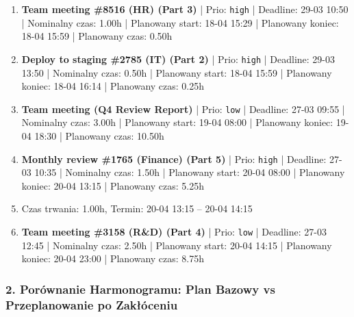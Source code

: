 {\begin{enumerate}
  \item [\textbf{14624}] \textbf{Team meeting \#8516 (HR) (Part 3)} | Prio: \texttt{high} | Deadline: 29-03 10:50 | Nominalny czas: 1.00h | Planowany start: 18-04 15:29 | Planowany koniec: 18-04 15:59 | Planowany czas: 0.50h
  \item [\textbf{14623}] \textbf{Deploy to staging \#2785 (IT) (Part 2)} | Prio: \texttt{high} | Deadline: 29-03 13:50 | Nominalny czas: 0.50h | Planowany start: 18-04 15:59 | Planowany koniec: 18-04 16:14 | Planowany czas: 0.25h
  \item [\textbf{14682}] \textbf{Team meeting (Q4 Review Report)} | Prio: \texttt{low} | Deadline: 27-03 09:55 | Nominalny czas: 3.00h | Planowany start: 19-04 08:00 | Planowany koniec: 19-04 18:30 | Planowany czas: 10.50h
  \item [\textbf{14627}] \textbf{Monthly review \#1765 (Finance) (Part 5)} | Prio: \texttt{high} | Deadline: 27-03 10:35 | Nominalny czas: 1.50h | Planowany start: 20-04 08:00 | Planowany koniec: 20-04 13:15 | Planowany czas: 5.25h
  \item [\textbf{PRZERWA}] Czas trwania: 1.00h, Termin: 20-04 13:15 -- 20-04 14:15
  \item [\textbf{14688}] \textbf{Team meeting \#3158 (R\&D) (Part 4)} | Prio: \texttt{low} | Deadline: 27-03 12:45 | Nominalny czas: 2.50h | Planowany start: 20-04 14:15 | Planowany koniec: 20-04 23:00 | Planowany czas: 8.75h
\end{enumerate}
}

\subsubsection*{2. Porównanie Harmonogramu: Plan Bazowy vs Przeplanowanie po Zakłóceniu}


